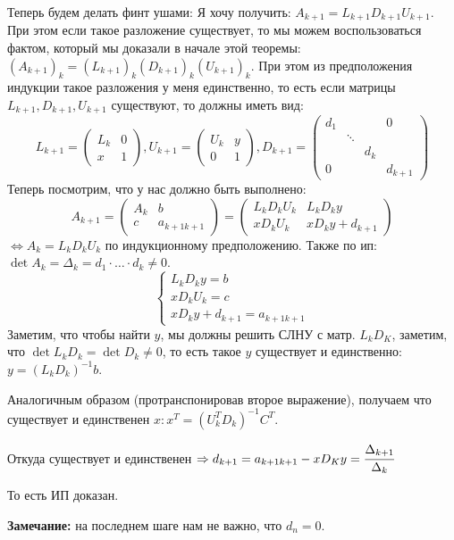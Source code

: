 \begin{enumerate}
        Теперь будем делать финт ушами: Я хочу получить: $A_{k+1} = L_{k+1}D_{k+1}U_{k+1}$. При этом если такое разложение существует, то мы можем воспользоваться фактом, который мы доказали в начале этой теоремы: $(A_{k+1})_k = (L_{k+1})_k(D_{k+1})_k (U_{k+1})_k$. При этом из предположения индукции такое разложения у меня единственно, то есть если матрицы $L_{k+1}, D_{k+1}, U_{k+1}$ существуют, то должны иметь вид:
        $$L_{k+1} = \begin{pmatrix}
            L_k & 0\\
            x & 1 
        \end{pmatrix}, U_{k+1} = \begin{pmatrix}
            U_k & y\\
            0 & 1 
        \end{pmatrix}, D_{k+1} = \begin{pmatrix}
            d_1 &  &  & 0\\
             &  \ddots &  &\\
             &  & d_{k} &\\
             0 & & & d_{k+1}
         \end{pmatrix}$$
         Теперь посмотрим, что у нас должно быть выполнено:
         $$A_{k+1} = \begin{pmatrix}
             A_k & b \\
             c & a_{k+1 k+1}
         \end{pmatrix} = \begin{pmatrix}
             L_kD_kU_k & L_kD_ky\\
             x D_k U_k & x D_ky + d_{k+1}
         \end{pmatrix}$$
         $\Leftrightarrow A_k = L_k D_k U_k$ по индукционному предположению. Также по ип: $\det A_k = \Delta_k = d_1\cdot \ldots \cdot d_k \neq 0$.
        $$\begin{cases}
            L_kD_k y =b\\
            x D_k U_k = c\\
            x D_k y + d_{k+1} = a_{k+1 k+1}
        \end{cases}$$
        Заметим, что чтобы найти $y$, мы должны решить СЛНУ с матр. $L_k D_K$, заметим, что $\det L_k D_k = \det D_k\neq 0$, то есть такое $y$ существует и единственно: $y = (L_k D_k)^{-1}b$.

        Аналогичным образом (протранспонировав второе выражение), получаем что существует и единственен $x: x^T = (U_k^T D_k)^{-1}C^T$.

        Откуда существует и единственен $\Rightarrow d_{k+1} = a_{k+1 k+1} -xD_Ky = \cfrac{\Delta_{k+1}}{\Delta_k}$

         То есть ИП доказан.
         
         \textbf{Замечание:} на последнем шаге нам не важно, что $d_n=0$.
    
    \end{enumerate}
    
